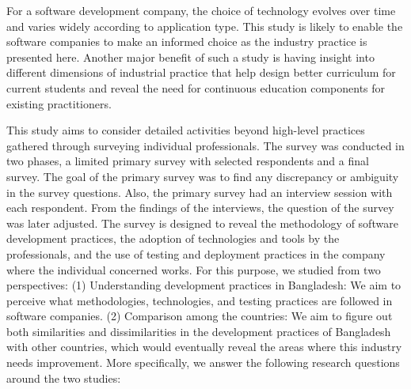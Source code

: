 For a software development company, the choice of technology evolves over time and varies widely according to application type. This study is likely to enable the software companies to make an informed choice as the industry practice is presented here. Another major benefit of such a study is having insight into different dimensions of industrial practice that help design better curriculum for current students and reveal the need for continuous education components for existing practitioners. 

This study aims to consider detailed activities beyond high-level practices gathered through surveying individual professionals. The survey was conducted in two phases, a limited primary survey with selected respondents and a final survey. The goal of the primary survey was to find any discrepancy or ambiguity in the survey questions. Also, the primary survey had an interview session with each respondent. From the findings of the interviews, the question of the survey was later adjusted. The survey is designed to reveal the methodology of software development practices, the adoption of technologies and tools by the professionals, and the use of testing and deployment practices in the company where the individual concerned works. For this purpose, we studied from two perspectives: (1) Understanding development practices in Bangladesh: We aim to perceive what methodologies, technologies, and testing practices are followed in software companies. (2) Comparison among the countries: We aim to figure out both similarities and dissimilarities in the development practices of Bangladesh with other countries, which would eventually reveal the areas where this industry needs improvement. 
More specifically, we answer the following research questions around the two studies:

